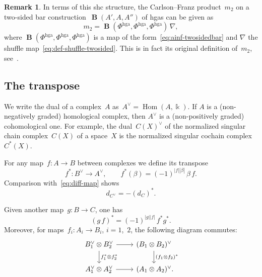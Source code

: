 \documentclass[letterpaper]{amsart}
\numberwithin{equation}{section}
\theoremstyle{plain}
\theoremstyle{definition}
\newtheorem{remark}[theorem]{Remark}
\theoremstyle{remark}
\DeclareMathOperator{\Hom}{Hom}
\DeclareMathOperator{\BB}{\mathbf{B}}
\def\kk{\Bbbk}
\def\deg#1{|#1|}
\let\KS\varkappa
\def\eqKS{\stackrel{\KS}{=}}
\let\shuffle\nabla
\def\Phihga{\Phi^{\mathrm{hga}}}
\begin{document}
\begin{remark}
  \label{rem:m2-hga}
  In terms of this shc structure, the Carlson--Franz product~$m_{2}$ on a two-sided bar construction~$\BB(A',A,A'')$
  of hgas can be given as
  \begin{equation}
    m_{2} = \BB(\Phihga,\Phihga,\Phihga)\,\shuffle,
  \end{equation}
  where $\BB(\Phihga,\Phihga,\Phihga)$ is a map of the form~\eqref{eq:ainf-twosidedbar}  %
  and $\shuffle$ the shuffle map~\eqref{eq:def-shuffle-twosided}.
  This is in fact its original definition of~$m_{2}$, see~\cite[eq.~(A.3)]{CarlsonFranz}.
\end{remark}


\subsection{The transpose}

We write the dual of a complex~$A$ as~$A^{\vee}=\Hom(A,\kk)$.
If $A$ is a (non-negatively graded) homological complex, then $A^{\vee}$ is a (non-positively graded) cohomological one.
For example, the dual~$C(X)^{\vee}$ of the normalized singular chain complex~$C(X)$ of a space~$X$
is the normalized singular cochain complex~$C^{*}(X)$.

For any map~$f\colon A\to B$ between complexes we define its transpose
\begin{equation}
  f^{*}\colon B^{\vee} \to A^{\vee},
  \qquad
  f^{*}(\beta) = (-1)^{\deg{f}\deg{\beta}}\,\beta\,f. %
\end{equation}
Comparison with~\eqref{eq:diff-map} shows
\begin{equation}
  \label{eq:transp-diff}
  d_{C^{\vee}} = - (d_{C})^{*}.
\end{equation}

Given another map~$g\colon B\to C$, one has
\begin{equation}
  \label{eq:transp-swap}
  (g\,f)^{*} = (-1)^{\deg{g}\deg{f}}\,f^{*} g^{*}.
\end{equation}
Moreover, for maps~$f_{i}\colon A_{i}\to B_{i}$, $i=1$,~$2$, the following diagram commutes:
\begin{equation}
  \label{eq:transp-tensor}
  \begin{tikzcd}
    B_{1}^{\vee}\otimes B_{2}^{\vee} \arrow{d}{f_{1}^{*}\otimes f_{2}^{*}} \arrow{r} & (B_{1}\otimes B_{2})^{\vee} \arrow{d}{(f_{1}\otimes f_{2})^{*}} \\
    A_{1}^{\vee}\otimes A_{2}^{\vee} \arrow{r} & (A_{1}\otimes A_{2})^{\vee} \mathrlap{.}
  \end{tikzcd}
\end{equation}
\end{document}
